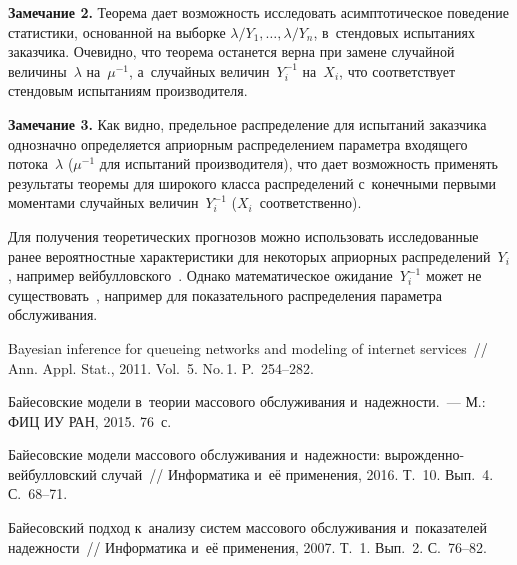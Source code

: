 \begin{multicols}{2}
\smallskip

\noindent
\textbf{Замечание 2.} Теорема дает возможность исследовать асимптотическое 
поведение статистики, основанной на выборке $\lambda/Y_1,\ldots,\lambda/Y_n$, 
в~стендовых испытаниях заказчика. Очевидно, что теорема останется верна при 
замене случайной величины~$\lambda$ на~$\mu^{-1}$, а~случайных величин~$Y_i^{-1}$ 
на~$X_i$, что соответствует стендовым испытаниям производителя.

\smallskip

\noindent
\textbf{Замечание 3.} Как видно, предельное распределение для испытаний 
заказчика однозначно определяется априорным распределением параметра 
входящего потока~$\lambda$ ($\mu^{-1}$ для испытаний производителя), 
что дает возможность применять результаты теоремы для широкого класса 
распределений с~конечными первыми моментами случайных величин~$Y_i^{-1}$ 
($X_i$~соответственно).

\smallskip

Для получения теоретических прогнозов можно использовать исследованные 
ранее вероятностные характеристики для некоторых априорных распределений~$Y_i$, 
например вейбулловского~\cite{KuTi16}. Однако
математическое ожидание~$Y_i^{-1}$ может не существовать~\cite{KuSh07}, например 
для показательного распределения параметра обслуживания.

{\small\frenchspacing
 {%
 \begin{thebibliography}{9}



Bayesian inference for queueing networks and modeling of internet services~// 
Ann. Appl. Stat., 2011. Vol.~5. No.\,1. P.~254--282.

Байесовские модели в~тео\-рии массового обслуживания и~надежности.~--- 
М.: ФИЦ ИУ РАН, 2015. 76~с.

Байесовские модели массового обслуживания и~надежности: 
вы\-рож\-ден\-но-вей\-бул\-лов\-ский случай~// 
Информатика и~её применения, 2016. Т.~10. Вып.~4. С.~68--71.

Байесовский подход к~анализу сис\-тем массового обслуживания и~показателей надежности~// 
Информатика и~её применения, 2007. Т.~1. Вып.~2. С.~76--82.
 \end{thebibliography}

 }
 }

\end{multicols}

